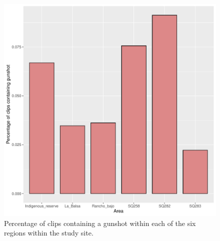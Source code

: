 \begin{figure}
\includegraphics[width=1.2\textwidth,center]{Figures/area_plot}\caption[Gunshot frequency by area]{Percentage of clips containing a gunshot within each of the six regions within the study site.}\label{fig:area_plot}
\end{figure}
